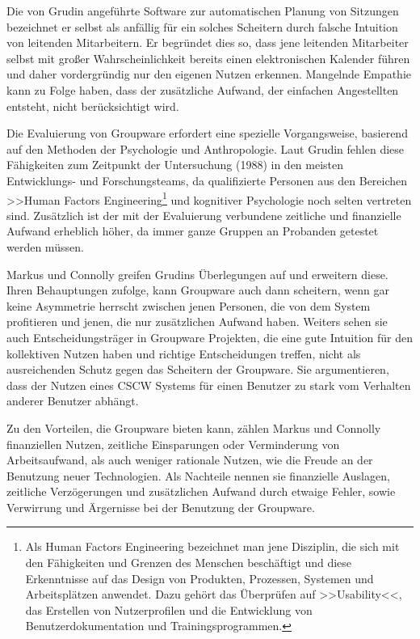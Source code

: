 Die von Grudin angeführte Software zur automatischen Planung von Sitzungen bezeichnet er selbst als anfällig für ein solches Scheitern durch falsche Intuition von leitenden Mitarbeitern. Er begründet dies so, dass jene leitenden Mitarbeiter selbst mit großer Wahrscheinlichkeit bereits einen elektronischen Kalender führen und daher vordergründig nur den eigenen Nutzen erkennen. Mangelnde Empathie kann zu Folge haben, dass der zusätzliche Aufwand, der einfachen Angestellten entsteht, nicht berücksichtigt wird.

\medskip Die Evaluierung von Groupware erfordert eine spezielle Vorgangsweise, basierend auf den Methoden der Psychologie und Anthropologie. Laut Grudin fehlen diese Fähigkeiten zum Zeitpunkt der Untersuchung (1988) in den meisten Entwicklungs- und Forschungsteams, da qualifizierte Personen aus den Bereichen >>Human Factors Engineering\footnote{Als Human Factors Engineering bezeichnet man jene Disziplin, die sich mit den Fähigkeiten und Grenzen des Menschen beschäftigt und diese Erkenntnisse auf das Design von Produkten, Prozessen, Systemen und Arbeitsplätzen anwendet. Dazu gehört das Überprüfen auf >>Usability<<, das Erstellen von Nutzerprofilen und die Entwicklung von Benutzerdokumentation und Trainingsprogrammen.} und kognitiver Psychologie noch selten vertreten sind. Zusätzlich ist der mit der Evaluierung verbundene zeitliche und finanzielle Aufwand erheblich höher, da immer ganze Gruppen an Probanden getestet werden müssen. \citep{Grudin:1988p126}

\medskip Markus und Connolly greifen Grudins Überlegungen auf und erweitern diese. Ihren Behauptungen zufolge, kann Groupware auch dann scheitern, wenn gar keine Asymmetrie herrscht zwischen jenen Personen, die von dem System profitieren und jenen, die nur zusätzlichen Aufwand haben. Weiters sehen sie auch Entscheidungsträger in Groupware Projekten, die eine gute Intuition für den kollektiven Nutzen haben und richtige Entscheidungen treffen, nicht als ausreichenden Schutz gegen das Scheitern der Groupware. Sie argumentieren, dass der Nutzen eines \ac{CSCW} Systems für einen Benutzer zu stark vom Verhalten anderer Benutzer abhängt. \citep{Markus:1990}

\medskip Zu den Vorteilen, die Groupware bieten kann, zählen Markus und Connolly finanziellen Nutzen, zeitliche Einsparungen oder Verminderung von Arbeitsaufwand, als auch weniger rationale Nutzen, wie die Freude an der Benutzung neuer Technologien. Als Nachteile nennen sie finanzielle Auslagen, zeitliche Verzögerungen und zusätzlichen Aufwand durch etwaige Fehler, sowie Verwirrung und Ärgernisse bei der Benutzung der Groupware. 

